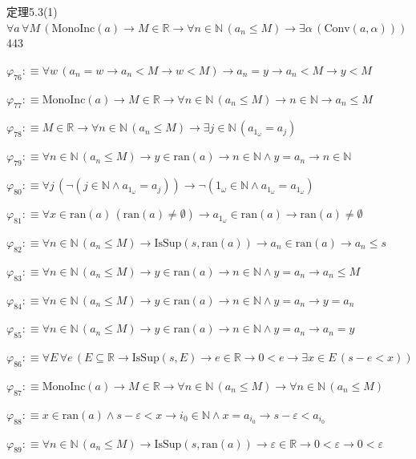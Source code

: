 \begin{fullproof}{定理5.3(1)}{$\forall a\,\forall M\,(\mathrm{MonoInc}(a) \to M \in \mathbb{R} \to \forall n \in \mathbb{N}\,(a_{n} \leq M) \to \exists \alpha\,(\mathrm{Conv}(a,\alpha)))$}{443}
\begin{abbrevlist}
\item $\varphi_{76} :\equiv \forall w\,(a_{n} = w \to a_{n} < M \to w < M) \to a_{n} = y \to a_{n} < M \to y < M$
\item $\varphi_{77} :\equiv \mathrm{MonoInc}(a) \to M \in \mathbb{R} \to \forall n \in \mathbb{N}\,(a_{n} \leq M) \to n \in \mathbb{N} \to a_{n} \leq M$
\item $\varphi_{78} :\equiv M \in \mathbb{R} \to \forall n \in \mathbb{N}\,(a_{n} \leq M) \to \exists j \in \mathbb{N}\,(a_{1_{\omega}} = a_{j})$
\item $\varphi_{79} :\equiv \forall n \in \mathbb{N}\,(a_{n} \leq M) \to y \in \mathrm{ran}(a) \to n \in \mathbb{N} \land y = a_{n} \to n \in \mathbb{N}$
\item $\varphi_{80} :\equiv \forall j\,(\neg (j \in \mathbb{N} \land a_{1_{\omega}} = a_{j})) \to \neg (1_{\omega} \in \mathbb{N} \land a_{1_{\omega}} = a_{1_{\omega}})$
\item $\varphi_{81} :\equiv \forall x \in \mathrm{ran}(a)\,(\mathrm{ran}(a) \neq \emptyset) \to a_{1_{\omega}} \in \mathrm{ran}(a) \to \mathrm{ran}(a) \neq \emptyset$
\item $\varphi_{82} :\equiv \forall n \in \mathbb{N}\,(a_{n} \leq M) \to \mathrm{IsSup}(s,\mathrm{ran}(a)) \to a_{n} \in \mathrm{ran}(a) \to a_{n} \leq s$
\item $\varphi_{83} :\equiv \forall n \in \mathbb{N}\,(a_{n} \leq M) \to y \in \mathrm{ran}(a) \to n \in \mathbb{N} \land y = a_{n} \to a_{n} \leq M$
\item $\varphi_{84} :\equiv \forall n \in \mathbb{N}\,(a_{n} \leq M) \to y \in \mathrm{ran}(a) \to n \in \mathbb{N} \land y = a_{n} \to y = a_{n}$
\item $\varphi_{85} :\equiv \forall n \in \mathbb{N}\,(a_{n} \leq M) \to y \in \mathrm{ran}(a) \to n \in \mathbb{N} \land y = a_{n} \to a_{n} = y$
\item $\varphi_{86} :\equiv \forall E\,\forall e\,(E \subseteq \mathbb{R} \to \mathrm{IsSup}(s,E) \to e \in \mathbb{R} \to 0 < e \to \exists x \in E\,(s - e < x))$
\item $\varphi_{87} :\equiv \mathrm{MonoInc}(a) \to M \in \mathbb{R} \to \forall n \in \mathbb{N}\,(a_{n} \leq M) \to \forall n \in \mathbb{N}\,(a_{n} \leq M)$
\item $\varphi_{88} :\equiv x \in \mathrm{ran}(a) \land s - \varepsilon < x \to i_{0} \in \mathbb{N} \land x = a_{i_{0}} \to s - \varepsilon < a_{i_{0}}$
\item $\varphi_{89} :\equiv \forall n \in \mathbb{N}\,(a_{n} \leq M) \to \mathrm{IsSup}(s,\mathrm{ran}(a)) \to \varepsilon \in \mathbb{R} \to 0 < \varepsilon \to 0 < \varepsilon$

\end{abbrevlist}
\end{fullproof}
